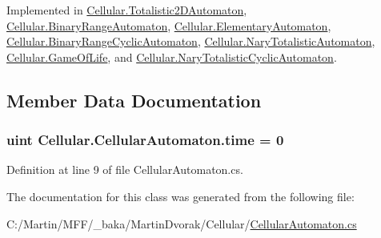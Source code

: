 Implemented in \hyperlink{class_cellular_1_1_totalistic2_d_automaton_aa009c674cd109fa70173e9893f6d3b09}{Cellular.\+Totalistic2\+D\+Automaton}, \hyperlink{class_cellular_1_1_binary_range_automaton_afad205eb4fea51efd63b063f96bfda5c}{Cellular.\+Binary\+Range\+Automaton}, \hyperlink{class_cellular_1_1_elementary_automaton_a812677139d560e2c600226361b785995}{Cellular.\+Elementary\+Automaton}, \hyperlink{class_cellular_1_1_binary_range_cyclic_automaton_a75754d1c54550e1f29a9282647947cb8}{Cellular.\+Binary\+Range\+Cyclic\+Automaton}, \hyperlink{class_cellular_1_1_nary_totalistic_automaton_aa691c532a55638c7e3d0c125a4244773}{Cellular.\+Nary\+Totalistic\+Automaton}, \hyperlink{class_cellular_1_1_game_of_life_a9a8627c06f5cd9c4f0e99d3e78582c62}{Cellular.\+Game\+Of\+Life}, and \hyperlink{class_cellular_1_1_nary_totalistic_cyclic_automaton_ac5c39cfb72386e3ab6132ab420091ae9}{Cellular.\+Nary\+Totalistic\+Cyclic\+Automaton}.



\subsection{Member Data Documentation}
\hypertarget{class_cellular_1_1_cellular_automaton_a6eaa8a9840fbc4c875d4e7d5a14e5f70}{}
\subsubsection[{time}]{\setlength{\rightskip}{0pt plus 5cm}uint Cellular.\+Cellular\+Automaton.\+time = 0\hspace{0.3cm}{\ttfamily [protected]}}\label{class_cellular_1_1_cellular_automaton_a6eaa8a9840fbc4c875d4e7d5a14e5f70}


Definition at line 9 of file Cellular\+Automaton.\+cs.



The documentation for this class was generated from the following file\+:\begin{DoxyCompactItemize}
\item 
C\+:/\+Martin/\+M\+F\+F/\+\_\+baka/\+Martin\+Dvorak/\+Cellular/\hyperlink{_cellular_automaton_8cs}{Cellular\+Automaton.\+cs}\end{DoxyCompactItemize}
